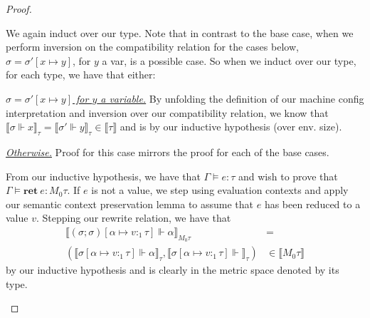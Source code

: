\begin{proof}
\begin{description}
\begin{description}
\begin{description}
        \end{description}
      \item[\textit{(env. size) n + 1.}] We again induct over our type. 
        Note that in contrast to the base case, when we perform inversion on the
        compatibility relation for the cases below, $\sigma = \sigma'[x \mapsto
        y]$, for $y$ a var, is a possible case. 
        So when we induct over our type, for each type, we have that either:
        \begin{description}
          \item{\underline{\textit{$\sigma = \sigma'[x \mapsto y]$ for $y$ a
            variable.}}} By unfolding the definition of our machine config
            interpretation and inversion over our compatibility relation, we
            know that $\llbracket \sigma \Vdash x \rrbracket_{\tau} = \llbracket
            \sigma' \Vdash y \rrbracket_{\tau} \in \llbracket \tau \rrbracket$
            and is  by our inductive hypothesis (over env.
            size).
          \item{\underline{\textit{Otherwise.}}} Proof for this case mirrors the
            proof for each of the base cases.
        \end{description}
    \end{description}
  \item[\textsc{(ty. rule) Ret.}] 
    From our inductive hypothesis, we have that $\Gamma \vDash e : \tau$ and
    wish to prove that $\Gamma \vDash \mathbf{ret} \ e : M_0 \tau$. 
    If $e$ is not a value, we step using evaluation contexts and apply our
    semantic context preservation lemma to assume that $e$ has been reduced to a
    value $v$.
    Stepping our rewrite relation, we have that 
    \begin{equation}
      \begin{aligned}
        \llbracket (\sigma; \sigma)[\alpha \mapsto v:_1 \tau] \Vdash \alpha
        \rrbracket_{M_0 \tau} 
        &= \\
        (\llbracket \sigma[\alpha \mapsto v:_1 \tau] \Vdash \alpha
        \rrbracket_{\tau}, \llbracket \sigma[\alpha
        \mapsto v:_1 \tau] \Vdash \rrbracket_{\tau})
        &\in 
        \llbracket M_0 \tau \rrbracket
      \end{aligned}
    \end{equation}
    by our inductive hypothesis and is clearly  in the metric
    space denoted by its type.
  \item[\textsc{(ty. rule) Rnd.}]

\end{description}
\end{proof}
